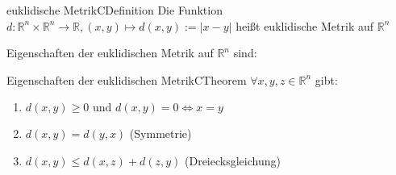 \documentclass[11.5 pt, a4paper]{memoir}
\begin{document}
\begin{ibox}{euklidische Metrik}{CDefinition}
    Die Funktion $ d: \mathbb{R}^{n}\times \mathbb{R}^{n} \to \mathbb{R}
, (x,y) \mapsto d(x,y) := |x-y|$ heißt euklidische Metrik auf
$ \mathbb{R}^{n}$
\end{ibox}
Eigenschaften der euklidischen Metrik auf $ \mathbb{R}^{n} $ sind:
\begin{ibox}{Eigenschaften der euklidischen Metrik}{CTheorem}
    $ \forall x,y,z \in \mathbb{R}^{n} $ gibt:
    \begin{enumerate}[label=\alph*)]
        \item $ d(x,y) \geq 0 \text{ und } d(x,y) = 0 \iff x = y $ 
        \item $ d(x,y) = d(y,x) $ (Symmetrie)
        \item $ d(x,y) \leq d(x,z) + d(z,y) $ (Dreiecksgleichung)
    \end{enumerate}
    
\end{ibox}
\end{document}
